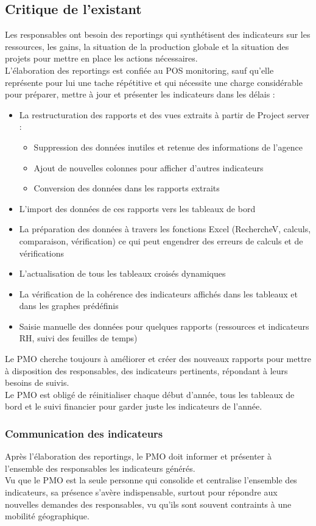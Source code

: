 \subsection{Critique de l’existant}
Les responsables ont besoin des reportings qui synthétisent des indicateurs sur les ressources, les gains, la situation de la production globale et la situation des projets pour mettre en place les actions nécessaires.\\
L’élaboration des reportings est confiée au POS monitoring, sauf qu’elle représente pour lui une tache répétitive et qui nécessite une charge considérable pour préparer, mettre à jour et présenter les indicateurs dans les délais :
\begin{itemize}[label=\textbullet]
\item La restructuration des rapports et des vues extraits à partir de Project server :
\begin{itemize}
\item Suppression des données inutiles et retenue des informations de l’agence
\item Ajout de nouvelles colonnes pour afficher d’autres indicateurs
\item Conversion des données dans les rapports extraits
\end{itemize}
\item L’import des données de ces rapports vers les tableaux de bord
\item La préparation des données à travers les fonctions Excel (RechercheV, calculs, comparaison, vérification) ce qui peut engendrer des erreurs de calculs et de vérifications
\item L’actualisation de tous les tableaux croisés dynamiques
\item La vérification de la cohérence des indicateurs affichés dans les tableaux et dans les graphes prédéfinis
\item Saisie manuelle des données pour quelques rapports (ressources et indicateurs RH, suivi des feuilles de temps)
\end{itemize}
Le PMO cherche toujours à améliorer et créer des nouveaux rapports pour mettre à disposition des responsables, des indicateurs pertinents, répondant à leurs besoins de suivis.\\
Le PMO est obligé de réinitialiser chaque début d’année, tous les tableaux de bord et le suivi financier pour garder juste les indicateurs de l’année.
\subsubsection*{Communication des indicateurs}
Après l’élaboration des reportings, le PMO doit informer et présenter à l’ensemble des responsables les indicateurs générés.\\
Vu que le PMO est la seule personne qui consolide et centralise l’ensemble des indicateurs, sa présence s’avère indispensable, surtout pour répondre aux nouvelles demandes des responsables, vu qu’ils sont souvent contraints à une mobilité géographique.
